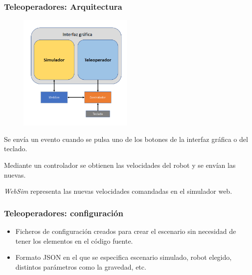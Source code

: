 \documentclass[xcolor={table}]{beamer}
\begin{document}
		
		\begin{frame}
		\frametitle{Teleoperadores: Arquitectura}
             \begin{figure}
            \centering
            \includegraphics[width=0.5\textwidth]{img/arquitecturaTeleoperador.png}
            \label{fig:droneteleop}
            \end{figure}
              \item Se envía un evento cuando se pulsa uno de los botones de la interfaz gráfica o del teclado.
              \item Mediante un controlador se obtienen las velocidades del robot y se envían las nuevas.
              \item  \textit{WebSim} representa las nuevas velocidades comandadas en el simulador web.
		\end{frame}
		
		\begin{frame}
			\frametitle{Teleoperadores: configuración}
			\newline
		    \begin{itemize}
		        \item Ficheros de configuración creados para crear el escenario sin necesidad de tener los elementos en el código fuente.
		        \item Formato JSON en el que se especifica escenario simulado, robot elegido, distintos parámetros como la gravedad, etc. 
		    \end{itemize}
		\end{frame}
		
\end{document}
